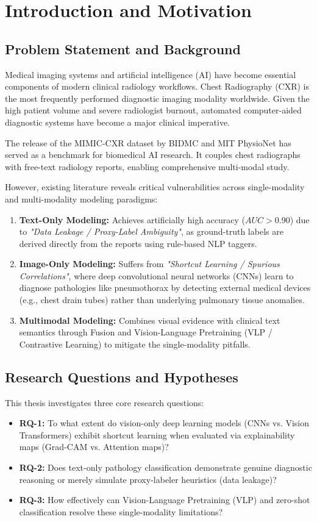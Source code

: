 \chapter{Introduction and Motivation}
\label{ch:introduction}

\section{Problem Statement and Background}
Medical imaging systems and artificial intelligence (AI) have become essential components of modern clinical radiology workflows. Chest Radiography (CXR) is the most frequently performed diagnostic imaging modality worldwide. Given the high patient volume and severe radiologist burnout, automated computer-aided diagnostic systems have become a major clinical imperative.

The release of the MIMIC-CXR dataset \cite{johnson2019mimic} by BIDMC and MIT PhysioNet has served as a benchmark for biomedical AI research. It couples chest radiographs with free-text radiology reports, enabling comprehensive multi-modal study.

However, existing literature reveals critical vulnerabilities across single-modality and multi-modality modeling paradigms:
\begin{enumerate}
    \item \textbf{Text-Only Modeling:} Achieves artificially high accuracy ($AUC > 0.90$) due to \textit{"Data Leakage / Proxy-Label Ambiguity"}, as ground-truth labels are derived directly from the reports using rule-based NLP taggers.
    \item \textbf{Image-Only Modeling:} Suffers from \textit{"Shortcut Learning / Spurious Correlations"}, where deep convolutional neural networks (CNNs) learn to diagnose pathologies like pneumothorax by detecting external medical devices (e.g., chest drain tubes) rather than underlying pulmonary tissue anomalies.
    \item \textbf{Multimodal Modeling:} Combines visual evidence with clinical text semantics through Fusion and Vision-Language Pretraining (VLP / Contrastive Learning) to mitigate the single-modality pitfalls.
\end{enumerate}

\section{Research Questions and Hypotheses}
This thesis investigates three core research questions:
\begin{itemize}
    \item \textbf{RQ-1:} To what extent do vision-only deep learning models (CNNs vs. Vision Transformers) exhibit shortcut learning when evaluated via explainability maps (Grad-CAM vs. Attention maps)?
    \item \textbf{RQ-2:} Does text-only pathology classification demonstrate genuine diagnostic reasoning or merely simulate proxy-labeler heuristics (data leakage)?
    \item \textbf{RQ-3:} How effectively can Vision-Language Pretraining (VLP) and zero-shot classification resolve these single-modality limitations?
\end{itemize}

